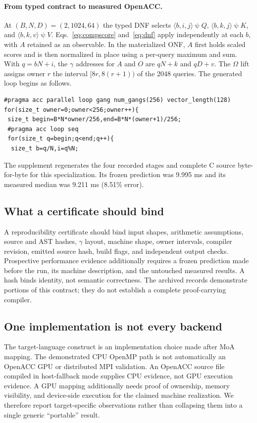 \documentclass[sigplan,10pt,review,anonymous,balance=false,pbalance=false]{acmart}
\newcommand{\ps}{\mathbin{\psi}}
\begin{document}
\paragraph{From typed contract to measured OpenACC.}
At $(B,N,D)=(2,1024,64)$ the typed DNF selects $\langle b,i,j\rangle\ps Q$, $\langle b,k,j\rangle\ps K$, and $\langle b,k,v\rangle\ps V$. Eqs.~\eqref{eq:compscore} and~\eqref{eq:dnf} apply independently at each $b$, with $A$ retained as an observable. In the materialized ONF, $A$ first holds scaled scores and is then normalized in place using a per-query maximum and sum. With $q=bN+i$, the $\gamma$ addresses for $A$ and $O$ are $qN+k$ and $qD+v$. The $\Omega$ lift assigns owner $r$ the interval $[8r,8(r+1))$ of the 2048 queries. The generated loop begins as follows.
\begin{lstlisting}[basicstyle=\ttfamily\scriptsize,columns=fullflexible,breaklines=true]
#pragma acc parallel loop gang num_gangs(256) vector_length(128)
for(size_t owner=0;owner<256;owner++){
 size_t begin=B*N*owner/256,end=B*N*(owner+1)/256;
 #pragma acc loop seq
 for(size_t q=begin;q<end;q++){
  size_t b=q/N,i=q%N;
\end{lstlisting}
The supplement regenerates the four recorded stages and complete C source byte-for-byte for this specialization. Its frozen prediction was 9.995 ms and its measured median was 9.211 ms (8.51\% error).

\subsection{What a certificate should bind}
A reproducibility certificate should bind input shapes, arithmetic assumptions, source and AST hashes, $\gamma$ layout, machine shape, owner intervals, compiler revision, emitted source hash, build flags, and independent output checks. Prospective performance evidence additionally requires a frozen prediction made before the run, its machine description, and the untouched measured results. A hash binds identity, not semantic correctness. The archived records demonstrate portions of this contract; they do not establish a complete proof-carrying compiler.

\subsection{One implementation is not every backend}
The target-language construct is an implementation choice made after MoA mapping. The demonstrated CPU OpenMP path is not automatically an OpenACC GPU or distributed MPI validation. An OpenACC source file compiled in host-fallback mode supplies CPU evidence, not GPU execution evidence. A GPU mapping additionally needs proof of ownership, memory visibility, and device-side execution for the claimed machine realization. We therefore report target-specific observations rather than collapsing them into a single generic ``portable'' result.
\end{document}
